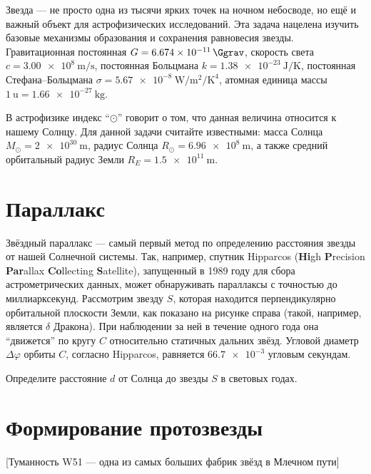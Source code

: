 

Звезда --- не просто одна из тысячи ярких точек на ночном небосводе, но ещё и важный объект для астрофизических исследований. Эта задача нацелена изучить базовые механизмы образования и сохранения равновесия звезды. Гравитационная постоянная $G=\qty{6.674e-11}{\Ggrav}$, скорость света $c=\qty{3.00e8}{\m\per\s}$, постоянная Больцмана $k=\qty{1.38e-23}{\J\per\K}$, постоянная Стефана--Больцмана $\sigma=\qty{5.67e-8}{\W\per\m\squared\per\K\tothe4}$, атомная единица массы $\qty{1}{\amu}=\qty{1.66e-27}{\kg}$.

В астрофизике индекс ``$\odot$'' говорит о том, что данная величина относится к нашему Солнцу. Для данной задачи считайте известными: масса Солнца $M_\odot=\qty{2e30}{\m}$, радиус Солнца $R_\odot=\qty{6.96e8}{\m}$, а также средний орбитальный радиус Земли $R_E=\qty{1.5e11}{\m}$.

\part{Параллакс}


Звёздный параллакс --- самый первый метод по определению расстояния звезды от нашей Солнечной системы. Так, например, спутник Hipparcos (\textbf{Hi}gh \textbf{P}recision \textbf{Par}allax \textbf{Co}llecting \textbf{S}atellite), запущенный в 1989 году для сбора астрометрических данных, может обнаруживать параллаксы с точностью до миллиарксекунд. Рассмотрим звезду $S$, которая находится перпендикулярно орбитальной плоскости Земли, как показано на рисунке справа (такой, например, является $\delta$ Дракона). При наблюдении за ней в течение одного года она ``движется'' по кругу $C$ относительно статичных дальних звёзд. Угловой диаметр $\Delta\varphi$ орбиты $C$, согласно Hipparcos, равняется $\num{66.7e-3}$ угловым секундам.

\begin{task}
    \item Определите расстояние $d$ от Солнца до звезды $S$ в световых годах.
\end{task}

\part{Формирование протозвезды}

[Туманность W51 --- одна из самых больших фабрик звёзд в Млечном пути]

